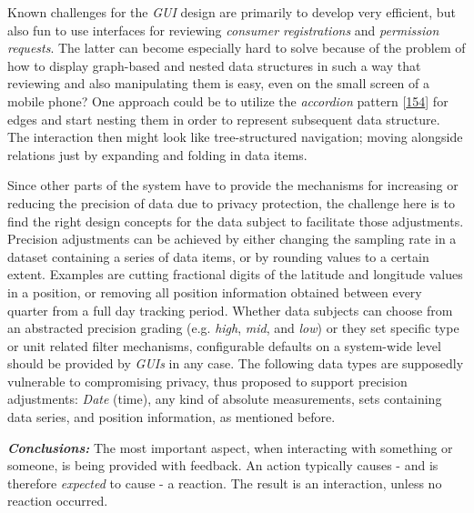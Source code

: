 \documentclass[12pt,english,a4paper,titlepage,cleardoublepage=empty,dottedtoc]{report}
\begin{document}
Known challenges for the \emph{GUI} design are primarily to develop very
efficient, but also fun to use interfaces for reviewing \emph{consumer
registrations} and \emph{permission requests}. The latter can become
especially hard to solve because of the problem of how to display
graph-based and nested data structures in such a way that reviewing and
also manipulating them is easy, even on the small screen of a mobile
phone? One approach could be to utilize the \emph{accordion} pattern
{[}\protect\hyperlink{ref-web_2016_wikipedia_accordion-gui}{154}{]} for
edges and start nesting them in order to represent subsequent data
structure. The interaction then might look like tree-structured
navigation; moving alongside relations just by expanding and folding in
data items.

Since other parts of the system have to provide the mechanisms for
increasing or reducing the precision of data due to privacy protection,
the challenge here is to find the right design concepts for the data
subject to facilitate those adjustments. Precision adjustments can be
achieved by either changing the sampling rate in a dataset containing a
series of data items, or by rounding values to a certain extent.
Examples are cutting fractional digits of the latitude and longitude
values in a position, or removing all position information obtained
between every quarter from a full day tracking period. Whether data
subjects can choose from an abstracted precision grading (e.g.
\emph{high}, \emph{mid}, and \emph{low}) or they set specific type or
unit related filter mechanisms, configurable defaults on a system-wide
level should be provided by \emph{GUIs} in any case. The following data
types are supposedly vulnerable to compromising privacy, thus proposed
to support precision adjustments: \emph{Date} (time), any kind of
absolute measurements, sets containing data series, and position
information, as mentioned before.

\emph{\textbf{Conclusions:}} The most important aspect, when interacting
with something or someone, is being provided with feedback. An action
typically causes - and is therefore \emph{expected} to cause - a
reaction. The result is an interaction, unless no reaction occurred.
\end{document}
